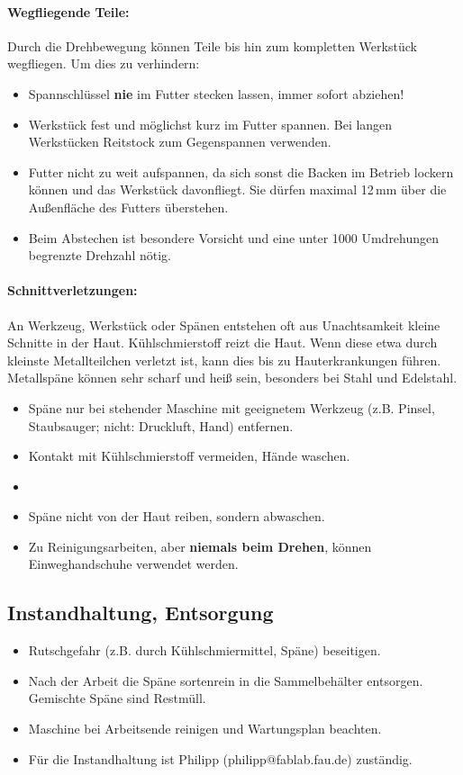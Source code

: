 \documentclass{\basedir/fablab-document}
\begin{document}
\paragraph{Wegfliegende Teile:} Durch die Drehbewegung können Teile bis hin zum kompletten Werkstück wegfliegen. Um dies zu verhindern:
\begin{itemize}
 \item Spannschlüssel \textbf{nie} im Futter stecken lassen, immer sofort abziehen!
\item Werkstück fest und möglichst kurz im Futter spannen. Bei langen Werkstücken Reitstock zum Gegenspannen verwenden.
\item Futter nicht zu weit aufspannen, da sich sonst die Backen im Betrieb lockern können und das Werkstück davonfliegt. Sie dürfen maximal 12\,mm über die Außenfläche des Futters überstehen.
\item Beim Abstechen ist besondere Vorsicht und eine unter 1000 Umdrehungen begrenzte Drehzahl nötig.
\end{itemize}

\paragraph{Schnittverletzungen:} An Werkzeug, Werkstück oder Spänen entstehen oft aus Unachtsamkeit kleine Schnitte in der Haut. Kühlschmierstoff reizt die Haut. Wenn diese etwa durch kleinste Metallteilchen verletzt ist, kann dies bis zu Hauterkrankungen führen. Metallspäne können sehr scharf und heiß sein, besonders bei Stahl und Edelstahl.
\begin{itemize}
\item Späne nur bei stehender Maschine mit geeignetem Werkzeug (z.B. Pinsel, Staubsauger; nicht: Druckluft, Hand) entfernen. %
	\item Kontakt mit Kühlschmierstoff vermeiden, Hände waschen.
	\item {}
	\item Späne nicht von der Haut reiben, sondern abwaschen.
	\item Zu Reinigungsarbeiten, aber \textbf{niemals beim Drehen}, können Einweghandschuhe verwendet werden.
\end{itemize}

\subsection{Instandhaltung, Entsorgung}
\begin{itemize}
\item Rutschgefahr (z.B. durch Kühlschmiermittel, Späne) beseitigen.
\item Nach der Arbeit die Späne sortenrein in die Sammelbehälter entsorgen. Gemischte Späne sind Restmüll.
\item Maschine bei Arbeitsende reinigen und Wartungsplan beachten.
\item Für die Instandhaltung ist Philipp (philipp@fablab.fau.de) zuständig.
\end{itemize}
\end{document}
